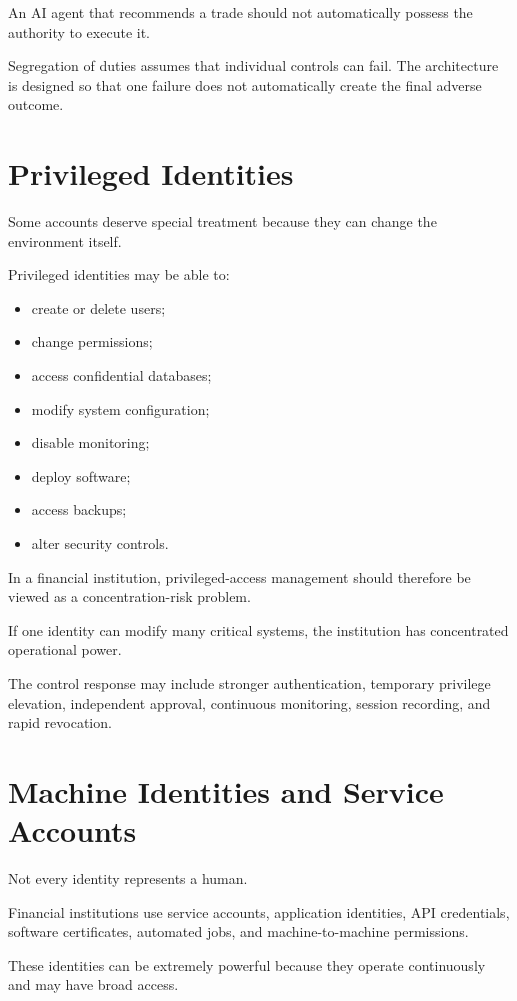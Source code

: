 An AI agent that recommends a trade should not automatically possess the authority to execute it.

Segregation of duties assumes that individual controls can fail. The architecture is designed so that one failure does not automatically create the final adverse outcome.

\section{Privileged Identities}

Some accounts deserve special treatment because they can change the environment itself.

Privileged identities may be able to:

\begin{itemize}
    \item create or delete users;
    \item change permissions;
    \item access confidential databases;
    \item modify system configuration;
    \item disable monitoring;
    \item deploy software;
    \item access backups;
    \item alter security controls.
\end{itemize}

In a financial institution, privileged-access management should therefore be viewed as a concentration-risk problem.

If one identity can modify many critical systems, the institution has concentrated operational power.

The control response may include stronger authentication, temporary privilege elevation, independent approval, continuous monitoring, session recording, and rapid revocation.

\section{Machine Identities and Service Accounts}

Not every identity represents a human.

Financial institutions use service accounts, application identities, API credentials, software certificates, automated jobs, and machine-to-machine permissions.

These identities can be extremely powerful because they operate continuously and may have broad access.

